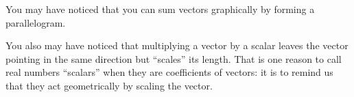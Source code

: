 \documentclass{ximera}
\begin{document}
You may have noticed that you can sum vectors graphically by forming a
parallelogram.
  		
You also may have noticed that multiplying a vector by a scalar leaves
the vector pointing in the same direction but ``scales'' its length.
That is one reason to call real numbers ``scalars'' when they are
coefficients of vectors: it is to remind us that they act
geometrically by scaling the vector.
  		
\end{document}
